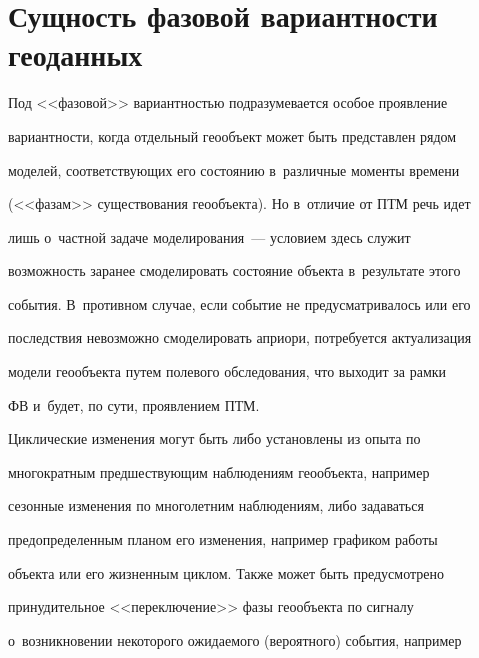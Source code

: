 \vspace*{-6pt}


     


     \section{Сущность фазовой вариантности геоданных}


     


     \vspace*{-3pt}


     


  Под <<фазовой>> вариантностью подразумевается особое проявление 


ва\-ри\-ант\-ности, когда отдельный геообъект может быть пред\-став\-лен рядом 


моделей, со\-от\-вет\-ст\-ву\-ющих его со\-сто\-янию в~различные моменты времени 


(<<фазам>> существования геообъекта). Но в~отличие от ПТМ речь идет 


лишь о~част\-ной задаче моделирования~--- условием здесь служит 


воз\-мож\-ность заранее смоделировать со\-сто\-яние объекта в~результате этого 


события. В~противном случае, если событие не предусмат\-ри\-ва\-лось или его 


последствия невозможно смоделировать априори, по\-тре\-бу\-ет\-ся актуализация 


модели геообъекта путем полевого обследования, что выходит за рамки 


ФВ и~будет, по сути, проявлением ПТМ. 


  


  Циклические изменения могут быть либо установлены из опыта по 


многократным пред\-шест\-ву\-ющим наблюдениям геообъекта, например 


сезонные изменения по многолетним наблюдениям, либо задаваться 


предопределенным планом его изменения, например графиком работы 


объекта или его жизненным циклом. Также может быть предусмот\-ре\-но 


принудительное <<переключение>> фазы геообъекта по сигналу 


о~возникновении некоторого ожи\-да\-емо\-го (вероятного) события, например 


